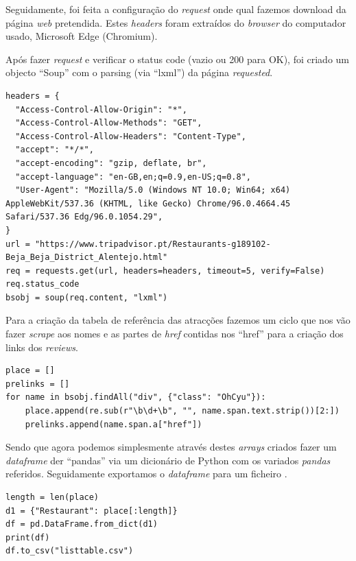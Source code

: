 \documentclass[a4paper,10pt]{article}
\begin{document}
Seguidamente, foi feita a configuração do \textit{request} onde qual fazemos download da página \textit{web} pretendida. Estes \textit{headers} foram extraídos do \textit{browser} do computador usado, Microsoft Edge (Chromium).

Após fazer \textit{request} e verificar o status code (vazio ou 200 para OK), foi criado um objecto ``Soup'' com o parsing (via ``lxml'') da página \textit{requested}.

\begin{verbatim}
headers = {
  "Access-Control-Allow-Origin": "*",
  "Access-Control-Allow-Methods": "GET",
  "Access-Control-Allow-Headers": "Content-Type",
  "accept": "*/*",
  "accept-encoding": "gzip, deflate, br",
  "accept-language": "en-GB,en;q=0.9,en-US;q=0.8",
  "User-Agent": "Mozilla/5.0 (Windows NT 10.0; Win64; x64) AppleWebKit/537.36 (KHTML, like Gecko) Chrome/96.0.4664.45 Safari/537.36 Edg/96.0.1054.29",
}
url = "https://www.tripadvisor.pt/Restaurants-g189102-Beja_Beja_District_Alentejo.html"
req = requests.get(url, headers=headers, timeout=5, verify=False)
req.status_code
bsobj = soup(req.content, "lxml")
\end{verbatim}

Para a criação da tabela de referência das atracções fazemos um ciclo que nos vão fazer \textit{scrape} aos nomes e as partes de \textit{href} contidas nos ``href'' para a criação dos links dos \textit{reviews}.

\begin{verbatim}
place = []
prelinks = []
for name in bsobj.findAll("div", {"class": "OhCyu"}):
    place.append(re.sub(r"\b\d+\b", "", name.span.text.strip())[2:])
    prelinks.append(name.span.a["href"])
\end{verbatim}

Sendo que agora podemos simplesmente através destes \textit{arrays} criados fazer um \textit{dataframe} der ``pandas'' via um dicionário de Python com os variados \textit{pandas} referidos. Seguidamente exportamos o \textit{dataframe} para um ficheiro .

\begin{verbatim}
length = len(place)
d1 = {"Restaurant": place[:length]}
df = pd.DataFrame.from_dict(d1)
print(df)
df.to_csv("listtable.csv")
\end{verbatim}

\newpage
\end{document}
